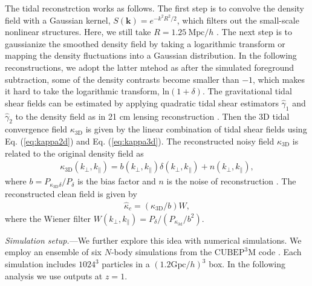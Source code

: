 \documentclass[aps,prl,twocolumn,showpacs,superscriptaddress,groupedaddress,nofootinbib,floatfix]{revtex4}  %
\newcommand{\mr}{\mathrm}
\begin{document}
The tidal reconstrction works as follows. The first step is to convolve
the density field with a Gaussian kernel, $S(\bm{k})=e^{-k^2R^2/2}$, which
filters out the small-scale nonlinear structures.
Here, we still take $R=1.25\ \mr{Mpc}/h$ \cite{2012:pen,2015:zhu}. The
next step is to gaussianize the smoothed density field by taking a logarithmic
transform or mapping the density fluctuations into a Gaussian distribution. In 
the following reconstructions, we adopt the latter mtehod as after the simulated
foreground subtraction, some of the density contrasts become smaller than $-1$,
which makes it hard to take the logarithmic transform, $\mathrm{ln}(1+\delta)$.
The gravitational tidal shear fields can be estimated by applying quadratic 
tidal shear estimators $\hat{\gamma}_1$ and $\hat{\gamma}_2$ to the density 
field as in 21 cm lensing reconstruction \cite{2008:lu}. 
Then the 3D tidal convergence field $\kappa_\mr{3D}$ is given by the linear 
combination of tidal shear fields using Eq. (\ref{eq:kappa2d}) and 
Eq. (\ref{eq:kappa3d}).
The reconstructed noisy field $\kappa_\mr{3D}$ is related to the original 
density field as 
\begin{eqnarray}
\kappa_\mr{3D}(k_\perp,k_\parallel)=b(k_\perp,k_\parallel)
\delta(k_\perp,k_\parallel)+n(k_\perp,k_\parallel),
\end{eqnarray}
where $b=P_{\kappa_\mr{3D}\delta}/P_{\delta}$ is the bias factor and $n$ is 
the noise of reconstruction \cite{2015:zhu}. 
The reconstructed clean field is given by 
\begin{eqnarray}
\label{eq:kapc}
\hat{\kappa}_c=({\kappa_\mr{3D}}/{b})W,
\end{eqnarray}
where the Wiener filter $W(k_\perp,k_\parallel)=
P_\delta/(P_{\kappa_\mr{3d}}/b^2)$.

{\it Simulation setup.}---We further explore this idea with numerical 
simulations. We employ an ensemble of six $N$-body simulations from the
$\mr{CUBEP}^3\mr{M}$ code \cite{2013:code}. 
Each simulation includes $1024^3$ particles in a $(1.2\mr{Gpc}/h)^3$ box. 
In the following analysis we use outputs at $z=1$.
\end{document}
